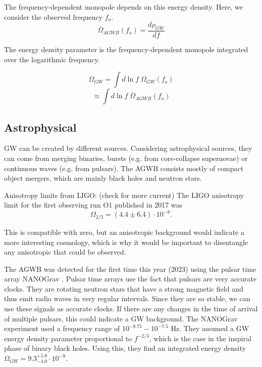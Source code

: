 The frequency-dependent monopole depends on this energy density. Here, we consider the observed frequency $f_o$.
\begin{equation}
    \bar{\Omega}_{AGWB}(f_o)=\frac{d\rho_{GW}}{df}
\end{equation}

The energy density parameter is the frequency-dependent monopole integrated over the logarithmic frequency.

\begin{equation}
    \Omega_{GW} = \int d\ln f \; \Omega_{GW}(f_o) 
\end{equation}
\begin{equation}
    \approx \int d\ln f \; \bar{\Omega}_{AGWB}(f_o)
\end{equation}

\subsection{Astrophysical}
GW can be created by different sources. Considering astrophysical sources, they can come from
merging binaries, bursts (e.g. from core-collapse supernovae) or continuous waves 
(e.g. from pulsars). 
The AGWB consists mostly of compact object mergers, which are mainly black holes and neutron stars. 

Anisotropy limits from LIGO:
(check for more current)
The LIGO anisotropy limit for the first observing run O1 published in 2017
was 
\begin{equation}
    \Omega_{2/3} = (4.4 \pm 6.4) \cdot 10^{-8} .
\end{equation}

This is compatible with zero, but an anisotropic background would indicate
a more interesting cosmology, which is why it would be important to disentangle
any anisotropic that could be observed.

The AGWB was detected for the first time this year (2023) using the pulsar time array NANOGrav \cite{agazie_nanograv_2023}. Pulsar time arrays use the fact that pulsars are very accurate clocks. They are rotating neutron stars that have a strong magnetic field and thus emit radio waves in very regular intervals. Since they are so stable, we can use these signals as accurate clocks. If there are any changes in the time of arrival of multiple pulsars, this could indicate a GW background. 
The NANOGrav experiment used a frequency range of $10^{-8.75} - 10^{-7.5}$ Hz. They assumed a GW energy density parameter proportional to $f^{-2/3}$, which is the case in the inspiral phase of binary black holes. \cite{phinney_practical_2001}
Using this, they find an integrated energy density $\Omega_{GW} = 9.3^{+5.8}_{-4.0}\cdot 10^{-9}$.


